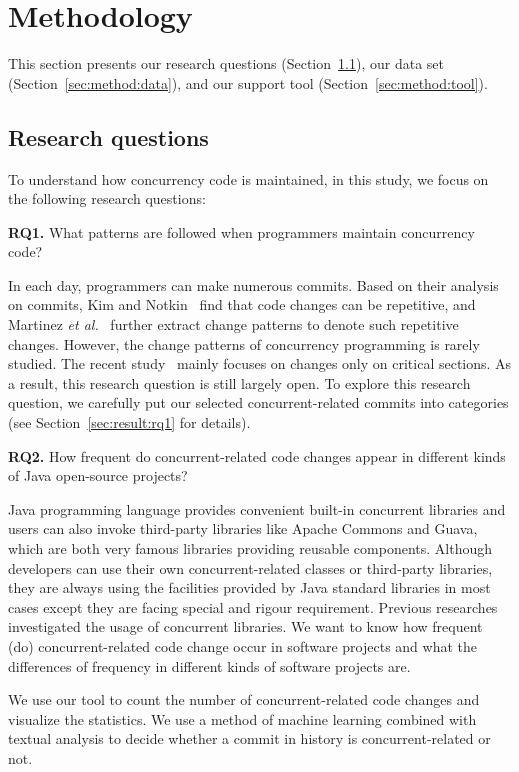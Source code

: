 \section{Methodology}
\label{sec:method}
This section presents our research questions (Section~\ref{sec:method:rq}), our data set (Section~\ref{sec:method:data}), and our support tool (Section~\ref{sec:method:tool}).
\subsection{Research questions}
\label{sec:method:rq}
To understand how concurrency code is maintained, in this study, we focus on the following research questions:

\textbf{RQ1.} What patterns are followed when programmers maintain concurrency code?

In each day, programmers can make numerous commits. Based on their analysis on commits, Kim and Notkin~\cite{conf/icse/KimN09} find that code changes can be repetitive, and Martinez \emph{et al.}~\cite{conf/icsm/MartinezDM13} further extract change patterns to denote such repetitive changes. However, the change patterns of concurrency programming is rarely studied. The recent study~\cite{conf/sigsoft/GuJSZL15} mainly focuses on changes only on critical sections. As a result, this research question is still largely open. To explore this research question, we carefully put our selected concurrent-related commits into  categories (see Section~\ref{sec:result:rq1} for details). 

\textbf{RQ2.} How frequent do concurrent-related code changes appear in different kinds of Java open-source projects?

Java programming language provides convenient built-in concurrent libraries and users can also invoke third-party libraries like Apache Commons and Guava, which are both very famous libraries providing reusable components. Although developers can use their own concurrent-related classes or third-party libraries, they are always using the facilities provided by Java standard libraries in most cases except they are facing special and rigour requirement. Previous researches \cite{journals/jss/PintoTFFB15, journals/infsof/WuCZX16, conf/sigsoft/OkurD12} investigated the usage of concurrent libraries. We want to know how frequent (do) concurrent-related code change occur in software projects and what the differences of frequency in different kinds of software projects are.

We use our tool to count the number of concurrent-related code changes and visualize the statistics. We use a method of machine learning combined with textual analysis to decide whether a commit in history is concurrent-related or not.

